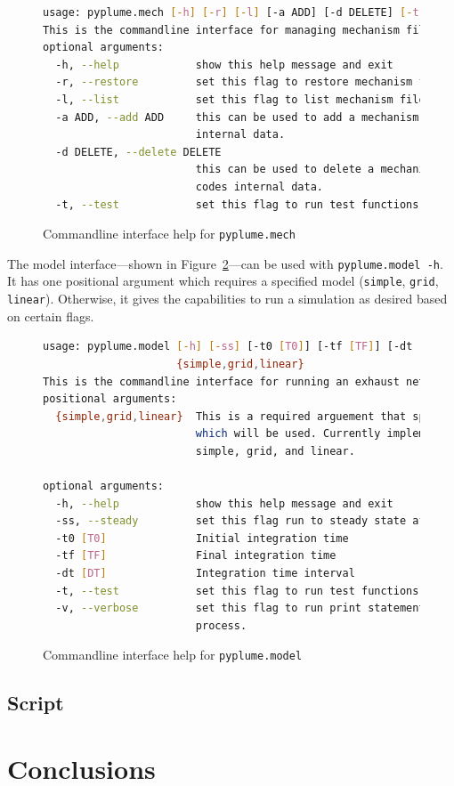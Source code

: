 \documentclass[smallextended,referee]{svjour3}
\newenvironment{codeblock}[1]
{
\begin{figure}[hbt]
\newcommand{\captionMacro}{#1}
\centering
\begin{tcolorbox}[width=15cm]
}
{
\end{tcolorbox}
\caption{\captionMacro{}}
\end{figure}
}
\begin{document}
\begin{codeblock}{Commandline interface help for \texttt{pyplume.mech}}
\begin{lstlisting}[language=bash]
usage: pyplume.mech [-h] [-r] [-l] [-a ADD] [-d DELETE] [-t]
This is the commandline interface for managing mechanism files of PyPlume.
optional arguments:
  -h, --help            show this help message and exit
  -r, --restore         set this flag to restore mechanism files.
  -l, --list            set this flag to list mechanism files.
  -a ADD, --add ADD     this can be used to add a mechanism file to the codes
                        internal data.
  -d DELETE, --delete DELETE
                        this can be used to delete a mechanism file to the
                        codes internal data.
  -t, --test            set this flag to run test functions.
\end{lstlisting}
\label{code:mech}
\end{codeblock}

The model interface---shown in Figure~\ref{code:model}---can be used with \texttt{pyplume.model -h}. It has one positional argument which requires a specified model (\texttt{simple}, \texttt{grid}, \texttt{linear}).
Otherwise, it gives the capabilities to run a simulation as desired based on certain flags.

\begin{codeblock}{Commandline interface help for \texttt{pyplume.model}}
\begin{lstlisting}[language=bash]
usage: pyplume.model [-h] [-ss] [-t0 [T0]] [-tf [TF]] [-dt [DT]] [-t] [-v]
                     {simple,grid,linear}
This is the commandline interface for running an exhaust network.
positional arguments:
  {simple,grid,linear}  This is a required arguement that specifies the model
                        which will be used. Currently implemented choices are
                        simple, grid, and linear.

optional arguments:
  -h, --help            show this help message and exit
  -ss, --steady         set this flag run to steady state after integration
  -t0 [T0]              Initial integration time
  -tf [TF]              Final integration time
  -dt [DT]              Integration time interval
  -t, --test            set this flag to run test functions.
  -v, --verbose         set this flag to run print statements during the
                        process.
\end{lstlisting}
\label{code:model}
\end{codeblock}



\subsection{\textbf{Script}}



\section{Conclusions}

\begin{acknowledgements}

\end{acknowledgements}

\appendix




\end{document}
